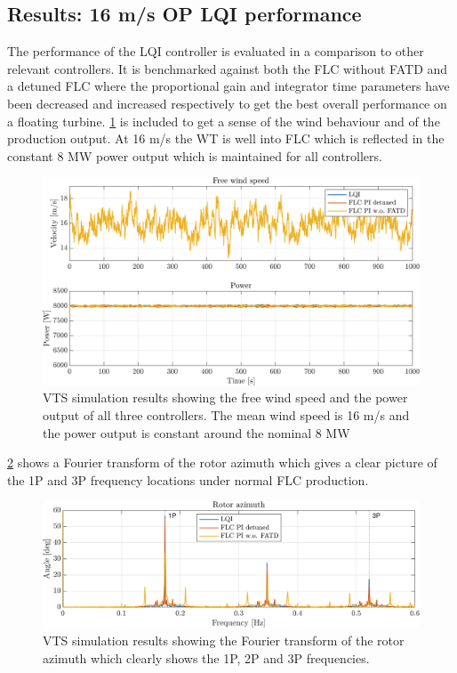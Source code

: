 \subsection{Results: 16 m/s OP LQI performance} \label{sec:test_vts_part1}
The performance of the LQI controller is evaluated in a comparison to other relevant controllers. It is benchmarked against both the FLC without FATD and a detuned FLC where the proportional gain and integrator time parameters have been decreased and increased respectively to get the best overall performance on a floating turbine. \cref{fig:vts_1_wind_pow} is included to get a sense of the wind behaviour and of the production output. At 16 m/s the WT is well into FLC which is reflected in the constant 8 MW power output which is maintained for all controllers.
\begin{figure}[ht]
	\centering
	\includegraphics[width=0.7\linewidth]{Graphics/TestResults/VTSplotting/1_wind_pow.png}
	\caption{VTS simulation results showing the free wind speed and the power output of all three controllers. The mean wind speed is 16 m/s and the power output is constant around the nominal 8 MW}
	\label{fig:vts_1_wind_pow}
\end{figure}
\cref{fig:vts_2_fftazi} shows a Fourier transform of the rotor azimuth which gives a clear picture of the 1P and 3P frequency locations under normal FLC production.
\begin{figure}[ht]
	\centering
	\includegraphics[width=0.7\linewidth]{Graphics/TestResults/VTSplotting/2_fftazi.png}
	\caption{VTS simulation results showing the Fourier transform of the rotor azimuth which clearly shows the 1P, 2P and 3P frequencies.}
	\label{fig:vts_2_fftazi}
\end{figure}


